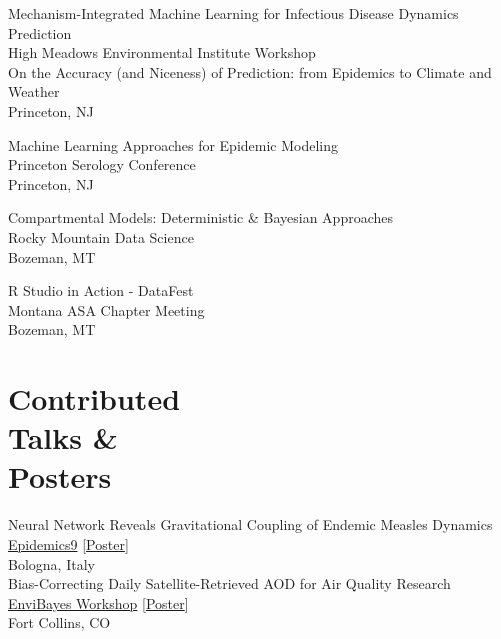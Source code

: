 \documentclass{wm_cv}
\begin{document}
Mechanism-Integrated Machine Learning for Infectious Disease Dynamics Prediction \hfill {} \\
    \indent \quad High Meadows Environmental Institute Workshop \\
    \indent \quad On the Accuracy (and Niceness) of Prediction: from Epidemics to Climate and Weather \\
   \indent \quad Princeton, NJ

Machine Learning Approaches for Epidemic Modeling\hfill {} \\
    \indent \quad Princeton Serology Conference  \\
   \indent \quad Princeton, NJ

Compartmental Models: Deterministic \& Bayesian Approaches \hfill {}\\ 
    \indent \quad Rocky Mountain Data Science  \\
   \indent \quad Bozeman, MT
   
R Studio in Action - DataFest \hfill {}\\ 
    \indent \quad Montana ASA Chapter Meeting  \\
   \indent \quad Bozeman, MT

\section{Contributed \\ Talks \& \\ Posters}
Neural Network Reveals Gravitational Coupling of Endemic Measles Dynamics \hfill {}\\
\indent \quad \href{https://www.elsevier.com/events/conferences/all/international-conference-on-infectious-disease-dynamics}{Epidemics9} [\href{https://www.wyattgmadden.com/files/posters/20231201epidemics/epidemics2023_poster.pdf}{Poster}] \\ 
   \indent \quad Bologna, Italy \\

Bias-Correcting Daily Satellite-Retrieved AOD for Air Quality Research \hfill {}\\
\indent \quad \href{https://statistics.colostate.edu/envibayes-workshop/}{EnviBayes Workshop} [\href{https://www.wyattgmadden.com/files/posters/20230918envibayes/envibayes2023.pdf}{Poster}] \\ 
   \indent \quad Fort Collins, CO \\
\end{document}
